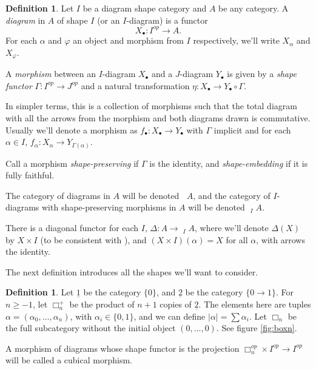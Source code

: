 \documentclass[proquest]{uwthesis}[2014/11/13]
\theoremstyle{definition}
\newtheorem{definition}[theorem]{Definition}
\DeclareMathOperator{\Diag}{\underline{Diag}}
\newcommand{\tu}{\underline{2}}
\begin{document}
\begin{definition}
	\label{def:diagram}
	Let $I$ be a diagram shape category and $A$ be any category.
	A \textit{diagram} in $A$ of shape $I$ (or an $I$-diagram) is a functor
	\[
		X_\bullet : I^{op} \rightarrow A.
	\]
	For each $\alpha$ and $\varphi$ an object and morphism from $I$ respectively, we'll write $X_\alpha$ and $X_\varphi$.
	
	A \textit{morphism} between an $I$-diagram $X_\bullet$ and a $J$-diagram $Y_\bullet$ is given by a \textit{shape functor} $\Gamma : I^{op} \rightarrow J^{op}$ and a natural transformation $\eta : X_\bullet \rightarrow Y_\bullet \circ \Gamma$.
	
	In simpler terms, this is a collection of morphisms such that the total diagram with all the arrows from the morphism and both diagrams drawn is commutative.
	Usually we'll denote a morphism as $f_\bullet : X_\bullet \rightarrow Y_\bullet$ with $\Gamma$ implicit and for each $\alpha \in I$, $f_\alpha : X_\alpha \rightarrow Y_{\Gamma(\alpha)}$.
	
	Call a morphism \textit{shape-preserving} if $\Gamma$ is the identity, and \textit{shape-embedding} if it is fully faithful.
	
	The category of diagrams in $A$ will be denoted $\Diag A$, and the category of $I$-diagrams with shape-preserving morphisms in $A$ will be denoted $\Diag_I A$.
	
	There is a diagonal functor for each $I$, $\Delta : A \rightarrow \Diag_I A$, where we'll denote $\Delta(X)$ by $X \times I$ (to be consistent with \cite{Guillen1988}), and $(X \times I)(\alpha) = X$ for all $\alpha$, with arrows the identity.
\end{definition}

The next definition introduces all the shapes we'll want to consider.

\begin{definition}
	\label{def:cubicalcategories}
	Let $\underline{1}$ be the category $\{0\}$, and $\tu$ be the category $\{0 \rightarrow 1\}$.
	For $n \geq -1$, let $\Box_n^+$ be the product of $n+1$ copies of $\tu$.
	The elements here are tuples $\alpha = (\alpha_0, \dots, \alpha_n)$, with $\alpha_i \in \{0, 1\}$, and we can define $|\alpha| = \sum \alpha_i$.
	Let $\Box_n$ be the full subcategory without the initial object $(0, \dots, 0)$.
	See figure \ref{fig:boxn}.
	
	A morphism of diagrams whose shape functor is the projection $\Box_n^{op} \times I^{op} \rightarrow I^{op}$ will be called a cubical morphism.
\end{definition}
\end{document}
